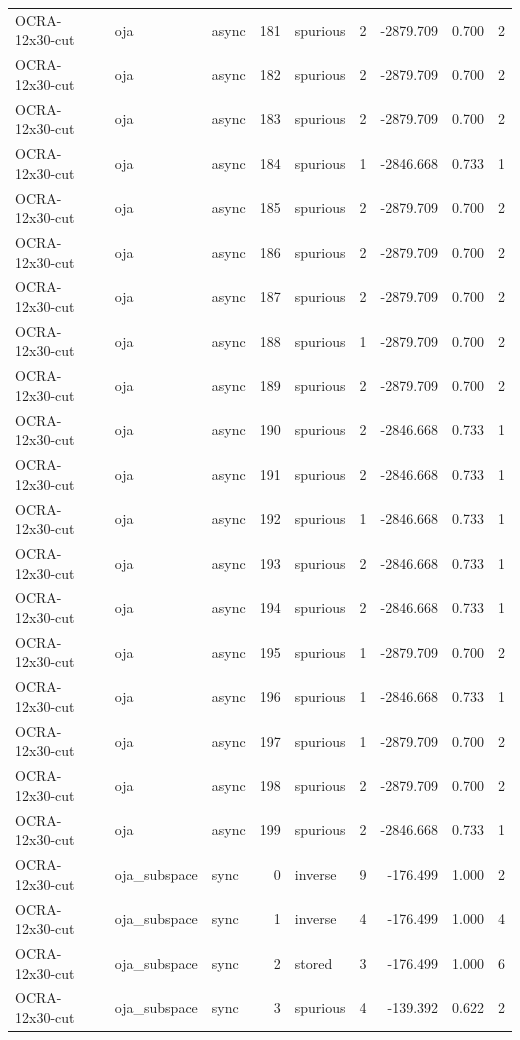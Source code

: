 \begin{tabular}{lllrlrrrr}
OCRA-12x30-cut & oja & async & 181 & spurious & 2 & -2879.709 & 0.700 & 2 \\
OCRA-12x30-cut & oja & async & 182 & spurious & 2 & -2879.709 & 0.700 & 2 \\
OCRA-12x30-cut & oja & async & 183 & spurious & 2 & -2879.709 & 0.700 & 2 \\
OCRA-12x30-cut & oja & async & 184 & spurious & 1 & -2846.668 & 0.733 & 1 \\
OCRA-12x30-cut & oja & async & 185 & spurious & 2 & -2879.709 & 0.700 & 2 \\
OCRA-12x30-cut & oja & async & 186 & spurious & 2 & -2879.709 & 0.700 & 2 \\
OCRA-12x30-cut & oja & async & 187 & spurious & 2 & -2879.709 & 0.700 & 2 \\
OCRA-12x30-cut & oja & async & 188 & spurious & 1 & -2879.709 & 0.700 & 2 \\
OCRA-12x30-cut & oja & async & 189 & spurious & 2 & -2879.709 & 0.700 & 2 \\
OCRA-12x30-cut & oja & async & 190 & spurious & 2 & -2846.668 & 0.733 & 1 \\
OCRA-12x30-cut & oja & async & 191 & spurious & 2 & -2846.668 & 0.733 & 1 \\
OCRA-12x30-cut & oja & async & 192 & spurious & 1 & -2846.668 & 0.733 & 1 \\
OCRA-12x30-cut & oja & async & 193 & spurious & 2 & -2846.668 & 0.733 & 1 \\
OCRA-12x30-cut & oja & async & 194 & spurious & 2 & -2846.668 & 0.733 & 1 \\
OCRA-12x30-cut & oja & async & 195 & spurious & 1 & -2879.709 & 0.700 & 2 \\
OCRA-12x30-cut & oja & async & 196 & spurious & 1 & -2846.668 & 0.733 & 1 \\
OCRA-12x30-cut & oja & async & 197 & spurious & 1 & -2879.709 & 0.700 & 2 \\
OCRA-12x30-cut & oja & async & 198 & spurious & 2 & -2879.709 & 0.700 & 2 \\
OCRA-12x30-cut & oja & async & 199 & spurious & 2 & -2846.668 & 0.733 & 1 \\
OCRA-12x30-cut & oja\_subspace & sync & 0 & inverse & 9 & -176.499 & 1.000 & 2 \\
OCRA-12x30-cut & oja\_subspace & sync & 1 & inverse & 4 & -176.499 & 1.000 & 4 \\
OCRA-12x30-cut & oja\_subspace & sync & 2 & stored & 3 & -176.499 & 1.000 & 6 \\
OCRA-12x30-cut & oja\_subspace & sync & 3 & spurious & 4 & -139.392 & 0.622 & 2 \\

\end{tabular}
